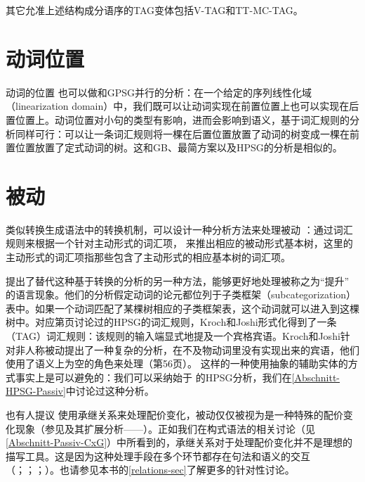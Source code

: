 其它允准上述结构成分语序的TAG变体包括V-TAG\citep{Rambow94a}和TT-MC-TAG\citep{Lichte2007a}。

\section{动词位置}

动词的位置
也可以做和GPSG并行的分析：在一个给定的序列线性化域（linearization domain）中，我们既可以让动词实现在前置位置上也可以实现在后置位置上。动词位置对小句的类型有影响，进而会影响到语义，基于词汇规则的分析同样可行：可以让一条词汇规则将一棵在后置位置放置了动词的树变成一棵在前置位置放置了定式动词的树。这和GB、最简方案以及HPSG的分析是相似的。 

\section{被动}

类似转换生成语法中的转换机制，可以设计一种分析方法来处理被动
：通过词汇规则来根据一个针对主动形式的词汇项，
来推出相应的被动形式基本树\citep[--51]{KJ85a}，这里的主动形式的词汇项指那些包含了主动形式的相应基本树的词汇项。

 \citet[]{KJ85a}提出了替代这种基于转换的分析的另一种方法，能够更好地处理被称之为“提升”
的语言现象。他们的分析假定动词的论元都位列于子类框架（subcategorization）表中。如果一个动词匹配了某棵树相应的子类框架表，这个动词就可以进入到这棵树中。对应第\pageref{pass-lr-mlr}页讨论过的HPSG的词汇规则，Kroch和Joshi形式化得到了一条（TAG）词汇规则：该规则的输入端显式地提及一个宾格宾语。Kroch和Joshi针对非人称被动提出了一种复杂的分析，在不及物动词里没有实现出来的宾语，他们使用了语义上为空的角色来处理（第56页）。
这样的一种使用抽象的辅助实体的方式事实上是可以避免的：我们可以采纳始于 \citet{Haider86}的HPSG\indexhpsgc 分析，我们在\ref{Abschnitt-HPSG-Passiv}中讨论过这种分析。

也有人提议
使用承继关系来处理配价变化，被动仅仅被视为是一种特殊的配价变化现象（参见\citealp{Candito96a}及其扩展分析——\citealp*{KSYJ2006a}）。正如我们在构式语法的相关讨论（见\ref{Abschnitt-Passiv-CxG}）中所看到的，承继关系对于处理配价变化并不是理想的描写工具。这是因为这种处理手段在多个环节都存在句法和语义的交互（\citealp{Mueller2006d,Mueller2007d}；\citeyear[\S~7.5.2]{MuellerLehrbuch1}；\citeyear{MuellerUnifying}；\citeyear{MWArgSt}）。也请参见本书的\ref{relations-sec}了解更多的针对性讨论。 

